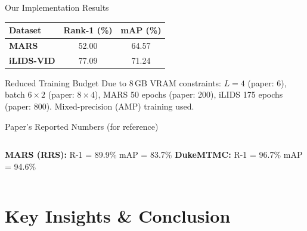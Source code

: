 \documentclass[aspectratio=169]{beamer}
\newcommand{\bt}[1]{\textbf{#1}}
\begin{document}
\begin{frame}{Our Implementation Results}
  \vspace{0.3em}
  \begin{table}
    \centering
    \renewcommand{\arraystretch}{1.5}
    \begin{tabular}{@{}lcc@{}}
      \toprule
      \textbf{Dataset} & \textbf{Rank-1 (\%)} & \textbf{mAP (\%)} \\
      \midrule
      \textbf{MARS}      & 52.00 & 64.57 \\
      \textbf{iLIDS-VID} & 77.09 & 71.24 \\
      \bottomrule
    \end{tabular}
  \end{table}

  \vspace{0.3em}
  \begin{alertblock}{\small Reduced Training Budget}
    \small Due to 8\,GB VRAM constraints: $L{=}4$ (paper: 6), batch $6{\times}2$ (paper: $8{\times}4$), MARS 50 epochs (paper: 200), iLIDS 175 epochs (paper: 800). Mixed-precision (AMP) training used.
  \end{alertblock}

  \vspace{0.3em}
  \begin{block}{Paper's Reported Numbers (for reference)}
    \begin{columns}[T]
        \small \bt{MARS (RRS):} \quad R-1 = 89.9\% \quad mAP = 83.7\%
        \small \bt{DukeMTMC:} \quad R-1 = 96.7\% \quad mAP = 94.6\%
    \end{columns}
  \end{block}
\end{frame}

\section{Key Insights \& Conclusion}
\end{document}
